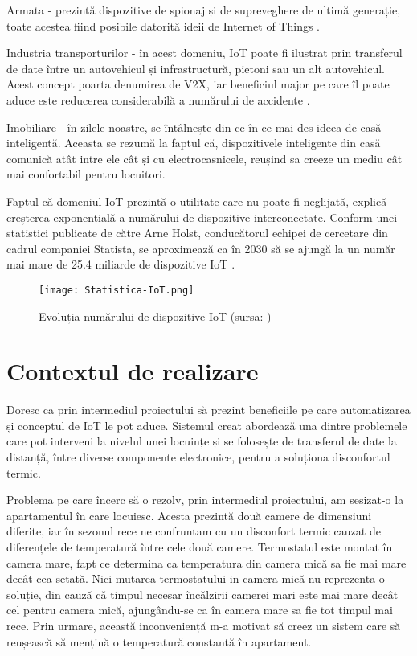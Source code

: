	Armata - prezintă dispozitive de spionaj și de supreveghere de ultimă generație, toate acestea fiind posibile datorită ideii de Internet of Things \cite{army}.

	Industria transporturilor - în acest domeniu, IoT poate fi ilustrat prin transferul de date între un autovehicul și infrastructură, pietoni sau un alt autovehicul. Acest concept poarta denumirea de V2X, iar beneficiul major pe care îl poate aduce este reducerea considerabilă a numărului de accidente \cite{V2X}.   

	Imobiliare - în zilele noastre, se întâlnește din ce în ce mai des ideea de casă inteligentă. Aceasta se rezumă la faptul că, dispozitivele inteligente din casă comunică atât intre ele cât și cu electrocasnicele, reușind sa creeze un mediu cât mai confortabil pentru locuitori.

	Faptul că domeniul IoT prezintă o utilitate care nu poate fi neglijată, explică creșterea exponențială a numărului de dispozitive interconectate. Conform unei statistici publicate de către Arne Holst, conducătorul echipei de cercetare din cadrul companiei Statista, se aproximează ca în 2030 să se ajungă la un număr mai mare de 25.4 miliarde de dispozitive IoT \cite{increaseOfIot}.

\bigskip

\begin{figure}[H]
   	\centering
    	\texttt{[image: Statistica-IoT.png]}
	\caption{Evoluția numărului de dispozitive IoT (sursa: \cite{increaseOfIot})}
\end{figure}

\section{Contextul de realizare}\label{sec:context}
	Doresc ca prin intermediul proiectului să prezint beneficiile pe care automatizarea și conceptul de IoT le pot aduce. Sistemul creat abordează una dintre problemele care pot interveni la nivelul unei locuințe și se folosește de transferul de date la distanță, între diverse componente electronice, pentru a soluționa disconfortul termic.

	Problema pe care încerc să o rezolv, prin intermediul proiectului, am sesizat-o la apartamentul în care locuiesc. Acesta prezintă două camere de dimensiuni diferite, iar în sezonul rece ne confruntam cu un disconfort termic cauzat de diferențele de temperatură între cele două camere. Termostatul este montat în camera mare, fapt ce determina ca temperatura din camera mică sa fie mai mare decât cea setată. Nici mutarea termostatului in camera mică nu reprezenta o soluție, din cauză că timpul necesar încălzirii camerei mari este mai mare decât cel pentru camera mică, ajungându-se ca în camera mare sa fie tot timpul mai rece. Prin urmare, această inconveniență m-a motivat să creez un sistem care să reușească să mențină o temperatură constantă în apartament.

